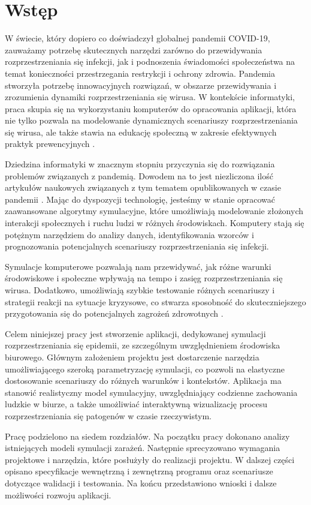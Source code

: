 \chapter*{Wstęp}
\label{Wstęp}

W świecie, który dopiero co doświadczył globalnej pandemii COVID-19, zauważamy potrzebę skutecznych narzędzi zarówno do przewidywania rozprzestrzeniania się infekcji, jak i podnoszenia świadomości społeczeństwa na temat konieczności przestrzegania restrykcji i ochrony zdrowia. Pandemia stworzyła potrzebę innowacyjnych rozwiązań, w obszarze przewidywania i zrozumienia dynamiki rozprzestrzeniania się wirusa. W kontekście informatyki, praca skupia się na wykorzystaniu komputerów do opracowania aplikacji, która nie tylko pozwala na modelowanie dynamicznych scenariuszy rozprzestrzeniania się wirusa, ale także stawia na edukację społeczną w zakresie efektywnych praktyk prewencyjnych \cite{bib:simulationforeducation}.

Dziedzina informatyki w znacznym stopniu przyczynia się do rozwiązania problemów związanych z pandemią. Dowodem na to jest niezliczona ilość artykułów naukowych związanych z tym tematem opublikowanych w czasie pandemii \cite{bib:covid19}\cite{bib:covid191}\cite{bib:covid192}. Mając do dyspozycji technologię, jesteśmy w stanie opracować zaawansowane algorytmy symulacyjne, które umożliwiają modelowanie złożonych interakcji społecznych i ruchu ludzi w różnych środowiskach. Komputery stają się potężnym narzędziem do analizy danych, identyfikowania wzorców i prognozowania potencjalnych scenariuszy rozprzestrzeniania się infekcji.

Symulacje komputerowe pozwalają nam przewidywać, jak różne warunki środowiskowe i społeczne wpływają na tempo i zasięg rozprzestrzeniania się wirusa. Dodatkowo, umożliwiają szybkie testowanie różnych scenariuszy i strategii reakcji na sytuacje kryzysowe, co stwarza sposobność do skuteczniejszego przygotowania się do potencjalnych zagrożeń zdrowotnych \cite{bib:Brockmann2017Global}.

Celem niniejszej pracy jest stworzenie aplikacji, dedykowanej symulacji rozprzestrzeniania się epidemii, ze szczególnym uwzględnieniem środowiska biurowego. Głównym założeniem projektu jest dostarczenie narzędzia umożliwiającego szeroką parametryzację symulacji, co pozwoli na elastyczne dostosowanie scenariuszy do różnych warunków i kontekstów. Aplikacja ma stanowić realistyczny model symulacyjny, uwzględniający codzienne zachowania ludzkie w biurze, a także umożliwiać interaktywną wizualizację procesu rozprzestrzeniania się patogenów w czasie rzeczywistym.

Pracę podzielono na siedem rozdziałów. Na początku pracy dokonano analizy istniejących modeli symulacji zarażeń. Następnie sprecyzowano wymagania projektowe i narzędzia, które posłużyły do realizacji projektu. W dalszej części opisano specyfikacje wewnętrzną i zewnętrzną programu oraz scenariusze dotyczące walidacji i testowania. Na końcu  przedstawiono wnioski i dalsze możliwości rozwoju aplikacji.
